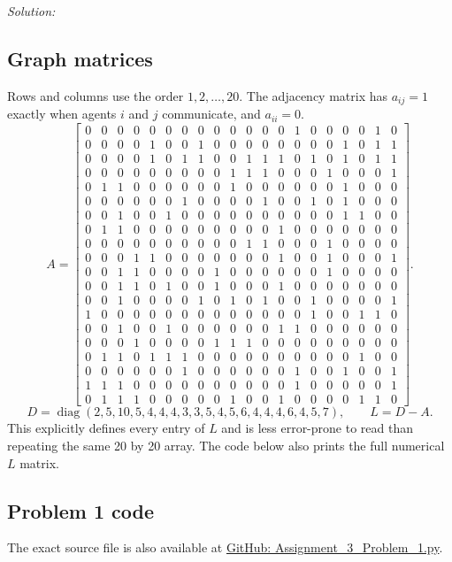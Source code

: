 \documentclass[a4paper,11pt]{article}
\newenvironment{solution}{\textit{Solution:}}{}
\newcommand{\repoURL}{https://github.com/splittersplatter/MAS}
\begin{document}
\begin{solution}
\subsection*{Graph matrices}
Rows and columns use the order $1,2,\ldots,20$. The adjacency matrix has $a_{ij}=1$ exactly when
agents $i$ and $j$ communicate, and $a_{ii}=0$.
\[
{\scriptstyle A=\begin{bmatrix}
0&0&0&0&0&0&0&0&0&0&0&0&0&1&0&0&0&0&1&0\\
0&0&0&0&1&0&0&1&0&0&0&0&0&0&0&0&1&0&1&1\\
0&0&0&0&1&0&1&1&0&0&1&1&1&0&1&0&1&0&1&1\\
0&0&0&0&0&0&0&0&0&1&1&1&0&0&0&1&0&0&0&1\\
0&1&1&0&0&0&0&0&0&1&0&0&0&0&0&0&1&0&0&0\\
0&0&0&0&0&0&1&0&0&0&0&1&0&0&1&0&1&0&0&0\\
0&0&1&0&0&1&0&0&0&0&0&0&0&0&0&0&1&1&0&0\\
0&1&1&0&0&0&0&0&0&0&0&0&1&0&0&0&0&0&0&0\\
0&0&0&0&0&0&0&0&0&0&1&1&0&0&0&1&0&0&0&0\\
0&0&0&1&1&0&0&0&0&0&0&0&1&0&0&1&0&0&0&1\\
0&0&1&1&0&0&0&0&1&0&0&0&0&0&0&1&0&0&0&0\\
0&0&1&1&0&1&0&0&1&0&0&0&1&0&0&0&0&0&0&0\\
0&0&1&0&0&0&0&1&0&1&0&1&0&0&1&0&0&0&0&1\\
1&0&0&0&0&0&0&0&0&0&0&0&0&0&1&0&0&1&1&0\\
0&0&1&0&0&1&0&0&0&0&0&0&1&1&0&0&0&0&0&0\\
0&0&0&1&0&0&0&0&1&1&1&0&0&0&0&0&0&0&0&0\\
0&1&1&0&1&1&1&0&0&0&0&0&0&0&0&0&0&1&0&0\\
0&0&0&0&0&0&1&0&0&0&0&0&0&1&0&0&1&0&0&1\\
1&1&1&0&0&0&0&0&0&0&0&0&0&1&0&0&0&0&0&1\\
0&1&1&1&0&0&0&0&0&1&0&0&1&0&0&0&0&1&1&0
\end{bmatrix}.}
\]
\[
{\scriptstyle D=\operatorname{diag}(2,5,10,5,4,4,4,3,3,5,4,5,6,4,4,4,6,4,5,7),}
\qquad L=D-A.
\]
This explicitly defines every entry of $L$ and is less error-prone to read than repeating the same
20 by 20 array. The code below also prints the full numerical $L$ matrix.

\subsection*{Problem 1 code}
The exact source file is also available at
\href{\repoURL/blob/main/Assignment_3_Problem_1.py}{GitHub: Assignment\_3\_Problem\_1.py}.

\end{solution}
\end{document}
